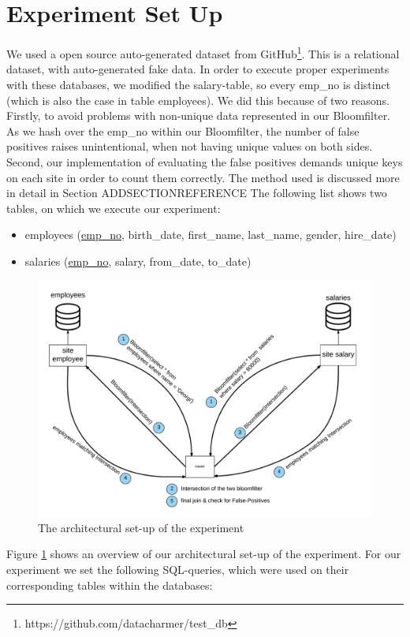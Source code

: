 \documentclass[12]{scrartcl}
\begin{document}
\section{Experiment Set Up}
We used a open source auto-generated dataset from GitHub\footnote{https://github.com/datacharmer/test\_db}. This is a relational dataset, with auto-generated fake data. In order to execute proper experiments with these databases, we modified the salary-table, so every emp\_no is distinct (which is also the case in table employees). We did this because of two reasons. Firstly, to avoid problems with non-unique data represented in our Bloomfilter. As we hash over the emp\_no within our Bloomfilter, the number of false positives raises unintentional, when not having unique values on both sides. Second, our implementation of evaluating the false positives demands unique keys on each site in order to count them correctly. The method used is discussed more in detail in Section ADDSECTIONREFERENCE The following list shows two tables, on which we execute our experiment: 
\begin{itemize}
	\item employees (\uline{emp\_no}, birth\_date, first\_name, last\_name, gender, hire\_date)
	\item salaries (\uline{emp\_no}, salary, from\_date, to\_date)
\end{itemize}



\begin{figure}[H]
	\begin{center}
		\includegraphics[scale=0.1]{res/architecture.png}
	\end{center}
	\caption{The architectural set-up of the experiment}
	\label{fig:architecture}
\end{figure}
Figure \ref{fig:architecture} shows an overview of our architectural set-up of the experiment. For our experiment we set the following SQL-queries, which were used on their corresponding tables within the databases:
\end{document}
